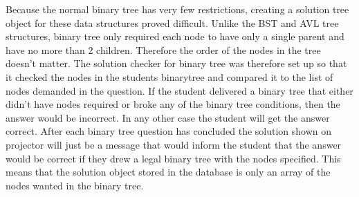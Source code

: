 Because the normal binary tree has very few restrictions, creating a solution tree object for these data structures proved difficult. Unlike the BST and AVL tree structures, binary tree only required each node to have only a single parent and have no more than 2 children. Therefore the order of the nodes in the tree doesn't matter. The solution checker for binary tree was therefore set up so that it checked the nodes in the students binarytree and compared it to the list of nodes demanded in the question. If the student delivered a binary tree that either didn't have nodes required or broke any of the binary tree conditions, then the answer would be incorrect. In any other case the student will get the answer correct. After each binary tree question has concluded the solution shown on projector will just be a message that would inform the student that the answer would be correct if they drew a legal binary tree with the nodes specified. This means that the solution object stored in the database is only an array of the nodes wanted in the binary tree.